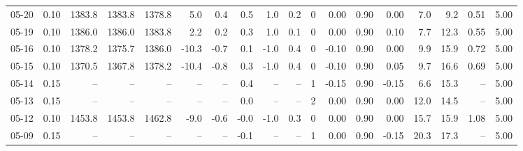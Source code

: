 \begin{threeparttable}
{\begin{tabular}{lrrrrrrrrrrrrrrrrr}
  05-20 &     0.10 & 1383.8 & 1383.8 & 1378.8 &        5.0 &            0.4 &                       0.5 &                      1.0 &                 0.2 &              0 &       0.00 &      0.90 &           0.00 &              7.0 &                 9.2 &            0.51 &                   5.00 \\
  05-19 &     0.10 & 1386.0 & 1386.0 & 1383.8 &        2.2 &            0.2 &                       0.3 &                      1.0 &                 0.1 &              0 &       0.00 &      0.90 &           0.10 &              7.7 &                12.3 &            0.55 &                   5.00 \\
  05-16 &     0.10 & 1378.2 & 1375.7 & 1386.0 &      -10.3 &           -0.7 &                       0.1 &                     -1.0 &                 0.4 &              0 &      -0.10 &      0.90 &           0.00 &              9.9 &                15.9 &            0.72 &                   5.00 \\
  05-15 &     0.10 & 1370.5 & 1367.8 & 1378.2 &      -10.4 &           -0.8 &                       0.3 &                     -1.0 &                 0.4 &              0 &      -0.10 &      0.90 &           0.05 &              9.7 &                16.6 &            0.69 &                   5.00 \\
  05-14 &     0.15 &     -- &     -- &     -- &         -- &             -- &                       0.4 &                       -- &                  -- &              1 &      -0.15 &      0.90 &          -0.15 &              6.6 &                15.3 &              -- &                   5.00 \\
  05-13 &     0.15 &     -- &     -- &     -- &         -- &             -- &                       0.0 &                       -- &                  -- &              2 &       0.00 &      0.90 &           0.00 &             12.0 &                14.5 &              -- &                   5.00 \\
  05-12 &     0.10 & 1453.8 & 1453.8 & 1462.8 &       -9.0 &           -0.6 &                      -0.0 &                     -1.0 &                 0.3 &              0 &       0.00 &      0.90 &           0.00 &             15.7 &                15.9 &            1.08 &                   5.00 \\
  05-09 &     0.15 &     -- &     -- &     -- &         -- &             -- &                      -0.1 &                       -- &                  -- &              1 &       0.00 &      0.90 &          -0.15 &             20.3 &                17.3 &              -- &                   5.00 \\

\end{tabular}}
\end{threeparttable}
